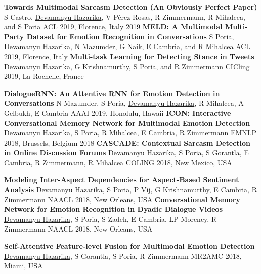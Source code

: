 \begin{cvpublications}
  \cvpublication
    {\textbf{Towards Multimodal Sarcasm Detection (An Obviously Perfect Paper)}}  %
    {S Castro, \underline{Devamanyu Hazarika}, V Pérez-Rosas, R Zimmermann, R Mihalcea, and S Poria} %
    {ACL 2019, Florence, Italy} %
    {2019} %
  \cvpublication
    {\textbf{MELD: A Multimodal Multi-Party Dataset for Emotion Recognition in Conversations}}  %
    {S Poria, \underline{Devamanyu Hazarika}, N Mazumder, G Naik, E Cambria, and R Mihalcea} %
    {ACL 2019, Florence, Italy} %
    {} %
  \cvpublication
    {\textbf{Multi-task Learning for Detecting Stance in Tweets}}  %
    {\underline{Devamanyu Hazarika}, G Krishnamurthy, S Poria, and R Zimmermann} %
    {CICling 2019, La Rochelle, France} %
    {} %

  \cvpublication
    {\textbf{DialogueRNN: An Attentive RNN for Emotion Detection in Conversations}}  %
    {N Mazumder, S Poria, \underline{Devamanyu Hazarika}, R Mihalcea, A Gelbukh, E Cambria} %
    {AAAI 2019, Honolulu, Hawaii} %
    {} %
  \cvpublication
    {\textbf{ICON: Interactive Conversational Memory Network for Multimodal Emotion Detection}}  %
    {\underline{Devamanyu Hazarika}, S Poria, R Mihalcea, E Cambria, R Zimmermann} %
    {EMNLP 2018, Brussels, Belgium} %
    {2018} %
  \cvpublication
    {\textbf{CASCADE: Contextual Sarcasm Detection in Online Discussion Forums}} %
    {\underline{Devamanyu Hazarika}, S Poria, S Gorantla, E Cambria, R Zimmermann, R Mihalcea} %
    {COLING 2018, New Mexico, USA} %
    {} %

  \cvpublication
    {\textbf{Modeling Inter-Aspect Dependencies for Aspect-Based Sentiment Analysis}} %
    {\underline{Devamanyu Hazarika}, S Poria, P Vij, G Krishnamurthy,  E Cambria, R Zimmermann} %
    {NAACL 2018, New Orleans, USA} %
    {} %
  \cvpublication
    {\textbf{Conversational Memory Network for Emotion Recognition in Dyadic Dialogue Videos}} %
    {\underline{Devamanyu Hazarika}, S Poria, S Zadeh, E Cambria, LP Morency, R Zimmermann} %
    {NAACL 2018, New Orleans, USA} %
    {} %

  \cvpublication
    {\textbf{Self-Attentive Feature-level Fusion for Multimodal Emotion Detection}} %
    {\underline{Devamanyu Hazarika}, S Gorantla, S Poria, R Zimmermann} %
    {MR2AMC 2018, Miami, USA} %
    {} %
\end{cvpublications}
